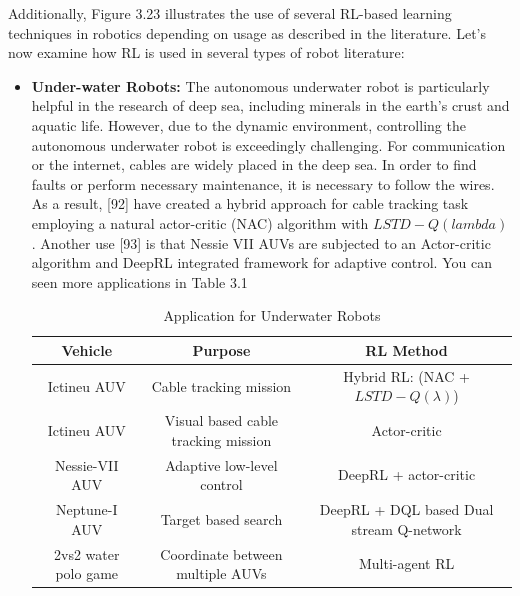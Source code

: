 \documentclass[12pt,twoside,a4]{mwbk}
\begin{document}
\noindent Additionally, Figure 3.23 illustrates the use of several RL-based learning techniques in robotics depending on usage as described in the literature. Let's now examine how RL is used in several types of robot literature:
\begin{itemize}
\item \textbf{Under-water Robots:} The autonomous underwater robot is particularly helpful in the research of deep sea, including minerals in the earth's crust and aquatic life. However, due to the dynamic environment, controlling the autonomous underwater robot is exceedingly challenging. For communication or the internet, cables are widely placed in the deep sea. In order to find faults or perform necessary maintenance, it is necessary to follow the wires. As a result, [92] have created a hybrid approach for cable tracking task employing a natural actor-critic (NAC) algorithm with $LSTD-Q(lambda)$. Another use [93] is that Nessie VII AUVs are subjected to an Actor-critic algorithm and DeepRL integrated framework for adaptive control. You can seen more applications in Table 3.1
\newpage    
\begin{table}[h!]
\centering
\begin{adjustbox}{width=1\textwidth}
\begin{tabular}{||c c c||} 
 \hline
 \textbf{Vehicle} &\textbf{Purpose} & \textbf{RL Method} \\ [0.5ex] 
 \hline\hline
 Ictineu AUV & Cable tracking mission & Hybrid RL: (NAC + $LSTD-Q(\lambda)$) \\ 
 \hline
 Ictineu AUV & Visual based cable tracking mission & Actor-critic \\
 \hline
 Nessie-VII AUV & Adaptive low-level control & DeepRL + actor-critic \\
 \hline
 Neptune-I AUV & Target based search & DeepRL + DQL based Dual stream Q-network \\
 \hline
 2vs2 water polo game & Coordinate between multiple AUVs & Multi-agent RL \\ [1ex]
 \hline
\end{tabular}
\end{adjustbox}
\caption{Application for Underwater Robots}
\end{table}


\end{itemize}
\end{document}
